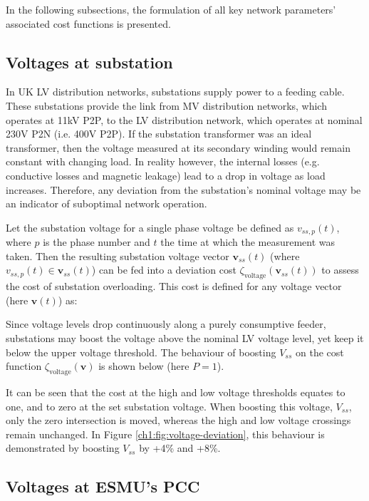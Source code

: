 In the following subsections, the formulation of all key network parameters' associated cost functions is presented.

\subsection{Voltages at substation}
\label{ch1:subsec:voltages-at-substation}

In UK LV distribution networks, substations supply power to a feeding cable.
These substations provide the link from MV distribution networks, which operates at 11kV P2P, to the LV distribution network, which operates at nominal 230V P2N (i.e. 400V P2P).
If the substation transformer was an ideal transformer, then the voltage measured at its secondary winding would remain constant with changing load.
In reality however, the internal losses (e.g. conductive losses and magnetic leakage) lead to a drop in voltage as load increases.
Therefore, any deviation from the substation's nominal voltage may be an indicator of suboptimal network operation.

Let the substation voltage for a single phase voltage be defined as $v_{ss,p}(t)$, where $p$ is the phase number and $t$ the time at which the measurement was taken.
Then the resulting substation voltage vector $\textbf{v}_{ss}(t)$ (where $v_{ss,p}(t) \in \textbf{v}_{ss}(t)$) can be fed into a deviation cost $\zeta_\text{voltage}(\textbf{v}_{ss}(t))$ to assess the cost of substation overloading.
This cost is defined for any voltage vector (here $\textbf{v}(t)$) as:



Since voltage levels drop continuously along a purely consumptive feeder, substations may boost the voltage above the nominal LV voltage level, yet keep it below the upper voltage threshold.
The behaviour of boosting $V_{ss}$ on the cost function $\zeta_\text{voltage}(\textbf{v})$ is shown below (here $P = 1$).



It can be seen that the cost at the high and low voltage thresholds equates to one, and to zero at the set substation voltage.
When boosting this voltage, $V_{ss}$, only the zero intersection is moved, whereas the high and low voltage crossings remain unchanged.
In Figure \ref{ch1:fig:voltage-deviation}, this behaviour is demonstrated by boosting $V_{ss}$ by +4\% and +8\%.

\subsection{Voltages at ESMU's PCC}
\label{ch1:subsec:voltages-at-esmu}

